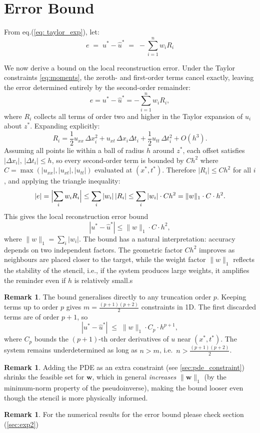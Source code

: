 \documentclass[12pt, a4paper, twoside]{report}
\theoremstyle{plain}
\theoremstyle{definition}
\newtheorem{remark}[theorem]{Remark}
\newcommand{\bw}{\mathbf{w}}
\newcommand{\normone}[1]{\lVert #1 \rVert_1}
\begin{document}
\section{Error Bound}

\label{sec:error_bound}
From eq.(\ref{eq: taylor_exp}), let: \[e \;=\; u^* - \hat{u}^* \;=\; -\sum_{i=1}^n w_i R_i\] 

We now derive a bound on the local reconstruction error. Under the Taylor 
constraints \eqref{eq:moments}, the zeroth- and first-order terms cancel 
exactly, leaving the error determined entirely by the second-order remainder:
\[
    e = u^* - \hat{u}^* = -\sum_{i=1}^n w_i R_i,
\]
where $R_i$ collects all terms of order two and higher in the Taylor expansion 
of $u_i$ about $z^*$. Expanding explicitly:
\[
    R_i = \frac{1}{2}u_{xx}\,\Delta x_i^2 
        + u_{xt}\,\Delta x_i\Delta t_i 
        + \frac{1}{2}u_{tt}\,\Delta t_i^2 
        + O(h^3).
\]
Assuming all points lie within a ball of radius $h$ around $z^*$, each 
offset satisfies $|\Delta x_i|,\,|\Delta t_i| \leq h$, so every second-order 
term is bounded by $Ch^2$ where 
$C = \max(|u_{xx}|, |u_{xt}|, |u_{tt}|)$ evaluated at $(x^*, t^*)$. 
Therefore $|R_i| \leq Ch^2$ for all $i$, and applying the triangle inequality:
\[
    |e| = \Bigl|\sum_i w_i R_i\Bigr| 
        \leq \sum_i |w_i|\,|R_i| 
        \leq \sum_i |w_i| \cdot Ch^2 
        = \|w\|_1 \cdot C \cdot h^2.
\]
This gives the local reconstruction error bound
\[
    \boxed{|u^* - \hat{u}^*| \leq \|w\|_1 \cdot C \cdot h^2,} \label{eq: error_bound}
\]
where $\|w\|_1 = \sum_i |w_i|$. The bound has a natural interpretation: 
accuracy depends on two independent factors. The geometric factor $Ch^2$ 
improves as neighbours are placed closer to the target, while the weight 
factor $\|w\|_1$ reflects the stability of the stencil, i.e., if the system produces large weights, it amplifies the reminder even if $h$ is relatively small.s


\begin{remark}
The bound generalises directly to any truncation order $p$. Keeping terms up
to order $p$ gives $m = \tfrac{(p+1)(p+2)}{2}$ constraints in 1D.
The first discarded terms are of order $p+1$, so
\[
  |u^* - \hat{u}^*| \;\leq\; \|w\|_1 \cdot C_p \cdot h^{p+1},
\]
where $C_p$ bounds the $(p+1)$-th order derivatives of $u$ near $(x^*,t^*)$.
The system remains underdetermined as long as $n > m$, i.e.\
$n > \tfrac{(p+1)(p+2)}{2}$.
\end{remark}

\begin{remark}
Adding the PDE as an extra constraint (see \cref{sec:pde_constraint})
shrinks the feasible set for $\bw$, which in general
\emph{increases} $\normone{\bw}$ (by the minimum-norm property of
the pseudoinverse), making the bound looser even though the stencil
is more physically informed.
\end{remark}
\begin{remark}
    For the numerical results for the error bound please check section (\ref{sec:exp2})
\end{remark}
\end{document}
